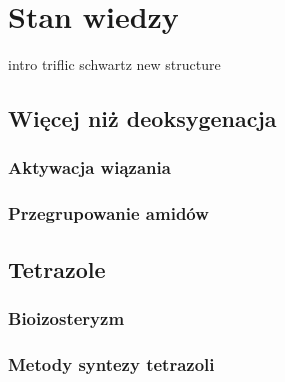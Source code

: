 \chapter{Stan wiedzy}\label{chapter:literature}

{intro}
{triflic}
{schwartz}
{new}
{structure}

\section{Więcej niż deoksygenacja}\label{literature:other}
\subsection{Aktywacja wiązania }\label{literature:other:c-n}
\subsection{Przegrupowanie amidów}\label{literature:other:umpolung}

\section{Tetrazole}\label{literature:tetrazole}
\subsection{Bioizosteryzm}\label{literature:tetrazole:bioisosterizm}
\subsection{Metody syntezy tetrazoli}\label{literature:tetrazole:synthesis}
